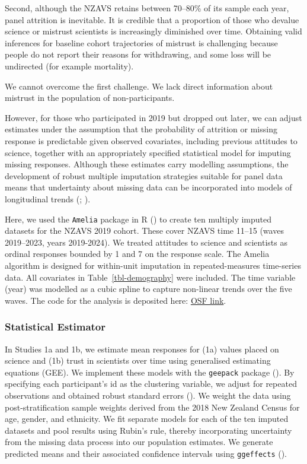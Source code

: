 \documentclass[
  single column]{article}
\begin{document}
Second, although the NZAVS retains between 70--80\% of its sample each
year, panel attrition is inevitable. It is credible that a proportion of
those who devalue science or mistrust scientists is increasingly
diminished over time. Obtaining valid inferences for baseline cohort
trajectories of mistrust is challenging because people do not report
their reasons for withdrawing, and some loss will be undirected (for
example mortality).

We cannot overcome the first challenge. We lack direct information about
mistrust in the population of non-participants.

However, for those who participated in 2019 but dropped out later, we
can adjust estimates under the assumption that the probability of
attrition or missing response is predictable given observed covariates,
including previous attitudes to science, together with an appropriately
specified statistical model for imputing missing responses. Although
these estimates carry modelling assumptions, the development of robust
multiple imputation strategies suitable for panel data means that
undertainty about missing data can be incorporated into models of
longitudinal trends (; ).

Here, we used the \texttt{Amelia} package in R
() to create ten
multiply imputed datasets for the NZAVS 2019 cohort. These cover NZAVS
time 11--15 (waves 2019--2023, years 2019-2024). We treated attitudes to
science and scientists as ordinal responses bounded by 1 and 7 on the
response scale. The Amelia algorithm is designed for within-unit
imputation in repeated-measures time-series data. All covariates in
Table~\ref{tbl-demography} were included. The time variable (year) was
modelled as a cubic spline to capture non-linear trends over the five
waves. The code for the analysis is deposited here:
\href{https://osf.io/wgtz4/}{OSF link}.

\subsubsection{Statistical Estimator}\label{statistical-estimator}

In Studies 1a and 1b, we estimate mean responses for (1a) values placed
on science and (1b) trust in scientists over time using generalised
estimating equations (GEE). We implement these models with the
\texttt{geepack} package (). By specifying each participant's id as the clustering
variable, we adjust for repeated observations and obtained robust
standard errors (). We weight the data using post-stratification sample weights
derived from the 2018 New Zealand Census for age, gender, and ethnicity.
We fit separate models for each of the ten imputed datasets and pool
results using Rubin's rule, thereby incorporating uncertainty from the
missing data process into our population estimates. We generate
predicted means and their associated confidence intervals using
\texttt{ggeffects} ().
\end{document}
